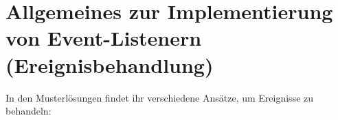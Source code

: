 \clearpage

\rehead[]{\textcolor{lightblue}{AvHG, Inf, My}}
\lohead[]{\textcolor{lightblue}{AvHG, Inf, My}}

\lstset{style=myJava}

\section[Allgemeines zur Implementierung von Event-Listenern
(Ereignisbehandlung)]{Allgemeines zur Implementierung von Event-Listenern\\
(Ereignisbehandlung)}

In den Musterlösungen findet ihr verschiedene Ansätze, um Ereignisse zu
behandeln:

